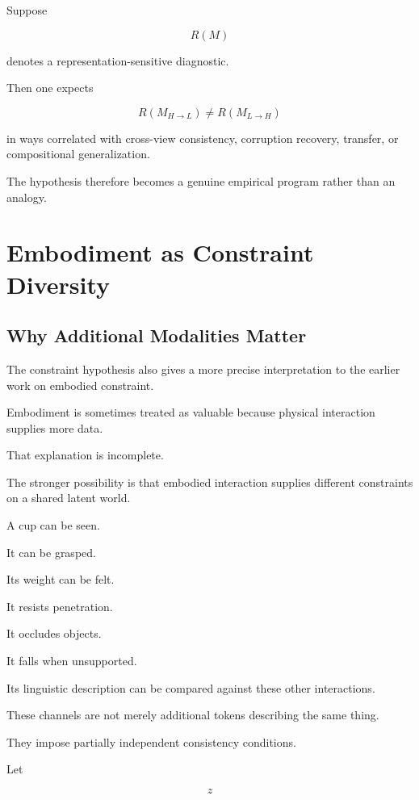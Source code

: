 \documentclass[11pt]{article}
\theoremstyle{remark}
\begin{document}
Suppose

\begin{equation}
R(M)
\end{equation}

denotes a representation-sensitive diagnostic.

Then one expects

\begin{equation}
R(M_{H\rightarrow L})
\neq
R(M_{L\rightarrow H})
\end{equation}

in ways correlated with cross-view consistency, corruption recovery, transfer, or compositional generalization.

The hypothesis therefore becomes a genuine empirical program rather than an analogy.

\section{Embodiment as Constraint Diversity}

\subsection{Why Additional Modalities Matter}

The constraint hypothesis also gives a more precise interpretation to the earlier work on embodied constraint.

Embodiment is sometimes treated as valuable because physical interaction supplies more data.

That explanation is incomplete.

The stronger possibility is that embodied interaction supplies different constraints on a shared latent world.

A cup can be seen.

It can be grasped.

Its weight can be felt.

It resists penetration.

It occludes objects.

It falls when unsupported.

Its linguistic description can be compared against these other interactions.

These channels are not merely additional tokens describing the same thing.

They impose partially independent consistency conditions.

Let

\begin{equation}
z
\end{equation}
\end{document}
